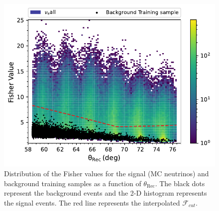 \begin{figure}[h!]
  \centering
  \includegraphics[width=\textwidth]{thesis_figures/Nu_analysis/Fisher_plots/Fisher_comp_bkg_sim_wnt.pdf}
  \caption{Distribution of the Fisher values for the signal (MC neutrinos) and background training samples as a function of $\theta_{\text{Rec}}$. The black dots represent the background events and the 2-D histogram represents the signal events. The red line represents the interpolated $\mathcal{F}_{cut}$.}
  \label{fig:Fish_bkg_sig}
\end{figure}

\FloatBarrier

